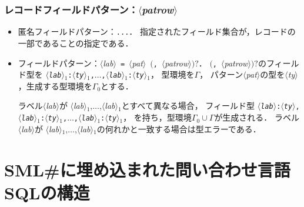 \documentclass{jbook}
\newcommand{\txt}[2]{#1}
\newcommand{\smlsharp}{SML\#}
\newcommand{\code}[1]{\mbox{\large\tt #1}}
\newcommand{\nonterm}[1]{\mbox{$\langle$}{\it #1}\mbox{$\rangle$}}
\newcommand{\term}[1]{\mbox{{\tt #1}}}
\newcommand{\optional}[1]{\mbox{$($}{\protect #1}\mbox{$)?$}}
\newcommand{\ass}{\Gamma}
\begin{document}
\subsubsection{レコードフィールドパターン：\nonterm{patrow}}

\begin{itemize}
\item 匿名フィールドパターン：\term{...}．
	指定されたフィールド集合が，レコードの一部であることの指定である．
\item フィールドパターン：\nonterm{lab}\ \term{=}\ \nonterm{pat}\ \optional{\term{,}\ \nonterm{patrow}}．
	\optional{\term{,}\ \nonterm{patrow}}のフィールド型を
\code{\nonterm{lab}$_1$:\nonterm{ty}$_1$,$\ldots$,\nonterm{lab}$_1$:\nonterm{ty}$_1$}，
型環境を$\ass$，
パターン\nonterm{pat}の型を\nonterm{ty}，生成する型環境を$\ass_0$とする．

	ラベル\nonterm{lab}が
\nonterm{lab}$_1$,$\ldots$,\nonterm{lab}$_1$とすべて異なる場合，
フィールド型
\code{\nonterm{lab}:\nonterm{ty},\nonterm{lab}$_1$:\nonterm{ty}$_1$,$\ldots$,\nonterm{lab}$_1$:\nonterm{ty}$_1$}，
を持ち，型環境$\ass_0 \cup \ass$が生成される．
	ラベル\nonterm{lab}が
\nonterm{lab}$_1$,$\ldots$,\nonterm{lab}$_1$の何れかと一致する場合は型エラーである．
\end{itemize}	

\section{\txt{\smlsharp{}に埋め込まれた問い合わせ言語SQLの構造}{}}
\end{document}
